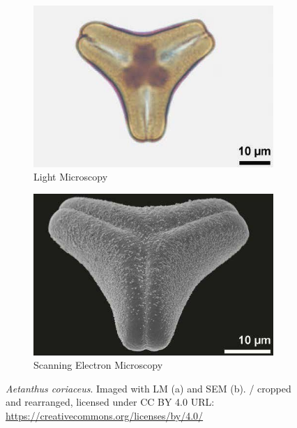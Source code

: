\begin{figure}[htb]
  \centering
  \begin{subfigure}[t]{0.4\textwidth}
    \centering
    \includegraphics[width=\textwidth]{figs/pollen_lm.jpg}
    \caption{Light Microscopy}
  \end{subfigure}%
  \hspace*{0.04\textwidth}
  \begin{subfigure}[t]{0.4\textwidth}
    \centering
    \includegraphics[width=\textwidth]{figs/pollen_sem.jpg}
    \caption{Scanning Electron Microscopy}
  \end{subfigure}
  \caption[Pollen grain imaging examples using LM and SEM]{\textit{Aetanthus coriaceus}.
  Imaged with LM (a) and SEM (b). \textcite[98]{halbritter_methods_2018} / cropped and rearranged, licensed under CC BY 4.0 URL\@: \url{https://creativecommons.org/licenses/by/4.0/}}\label{fig:lm_and_sem}
\end{figure}

